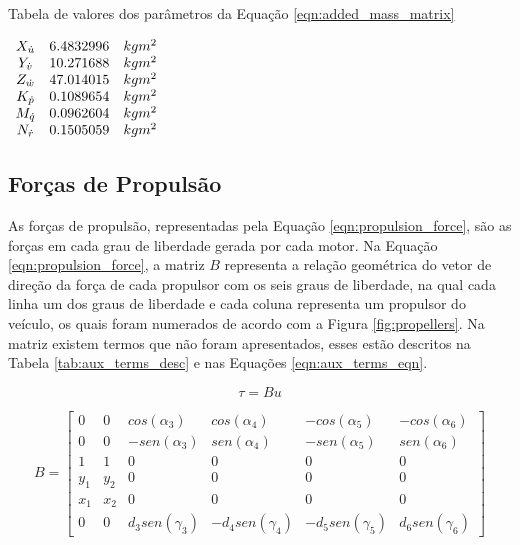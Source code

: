 \begin{table}[H]
	\centering
	\label{tab:added_mass_matrix_params}
	\caption{Tabela de valores dos parâmetros da Equação \ref{eqn:added_mass_matrix}}
	$\begin{array}{c c c}
		\begin{matrix} 
		X_{\dot{u}} & 6.4832996 & kg m^{2}\\ 
		Y_{\dot{v}} & 10.271688 & kg m^{2}\\ 
		Z_{\dot{w}} & 47.014015 & kg m^{2}\\ 
		K_{\dot{p}} & 0.1089654 & kg m^{2}\\
		M_{\dot{q}} & 0.0962604 & kg m^{2}\\
		N_{\dot{r}} & 0.1505059 & kg m^{2}
		\end{matrix}
	\end{array}$
\end{table}

\subsection{Forças de Propulsão}

As forças de propulsão, representadas pela Equação \ref{eqn:propulsion_force}, são as forças em cada grau de liberdade gerada por cada motor. Na Equação \ref{eqn:propulsion_force}, a matriz $B$ representa a relação geométrica do vetor de direção da força de cada propulsor com os seis graus de liberdade, na qual cada linha um dos graus de liberdade e cada coluna representa um propulsor do veículo, os quais foram numerados de acordo com a Figura \ref{fig:propellers}. Na matriz existem termos que não foram apresentados, esses estão descritos na Tabela \ref{tab:aux_terms_desc} e nas Equações \ref{eqn:aux_terms_eqn}.

\begin{equation}
	\label{eqn:propulsion_force}
	\tau = Bu 
\end{equation}

\begin{equation}
	\label{eqn:b_matrix}
	B =
	\begin{bmatrix}
		0 & 0 & cos(\alpha_3) & cos(\alpha_4) & -cos(\alpha_5) & -cos(\alpha_6)\\
		0 & 0 & -sen(\alpha_3) & sen(\alpha_4) & -sen(\alpha_5) & sen(\alpha_6)\\
		1 & 1 & 0 & 0 & 0 & 0\\
		y_1 & y_2 & 0 & 0 & 0 & 0\\
		x_1 & x_2 & 0 & 0 & 0 & 0\\
		0 & 0 & d_3sen(\gamma_3) & -d_4sen(\gamma_4) & -d_5sen(\gamma_5) & d_6sen(\gamma_6) 
	\end{bmatrix}  
\end{equation}

